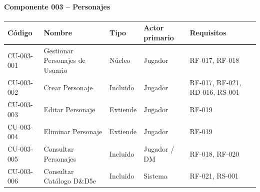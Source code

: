 \paragraph{Componente 003 -- Personajes}
{\footnotesize\setlength{\tabcolsep}{4pt}\renewcommand{\arraystretch}{1.15}
\begin{longtable}{|>{\raggedright\arraybackslash}p{1.9cm}|>{\raggedright\arraybackslash}p{4.4cm}|>{\raggedright\arraybackslash}p{1.7cm}|>{\raggedright\arraybackslash}p{2.5cm}|>{\raggedright\arraybackslash}p{4.0cm}|}
\hline
\textbf{Código} & \textbf{Nombre} & \textbf{Tipo} & \textbf{Actor primario} & \textbf{Requisitos} \\ \hline\endhead
CU-003-001 & Gestionar Personajes de Usuario & Núcleo & Jugador & RF-017, RF-018 \\ \hline
CU-003-002 & Crear Personaje & Incluido & Jugador & RF-017, RF-021, RD-016, RS-001 \\ \hline
CU-003-003 & Editar Personaje & Extiende & Jugador & RF-019 \\ \hline
CU-003-004 & Eliminar Personaje & Extiende & Jugador & RF-019 \\ \hline
CU-003-005 & Consultar Personajes & Incluido & Jugador / DM & RF-018, RF-020 \\ \hline
CU-003-006 & Consultar Catálogo D\&D5e & Incluido & Sistema & RF-021, RS-001 \\ \hline
\end{longtable}}
